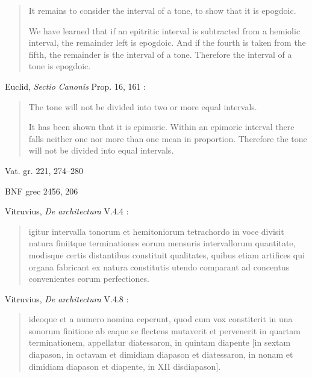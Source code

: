 \documentclass{amsart}
\theoremstyle{definition}
\begin{document}
\begin{quote}
It remains to consider the interval of a tone, to
show that it is epogdoic.

We have learned that if an epitritic interval is subtracted from a hemiolic
interval, the remainder left is epogdoic. And if the fourth is taken from the
fifth, the remainder is the interval of a tone. Therefore the interval of a tone
is epogdoic.
\end{quote}

Euclid, {\em Sectio Canonis} Prop. 16, 161 \cite[p.~202]{barker}:

\begin{quote}
The tone will not be divided into two or more
equal intervals.

It has been shown that it is epimoric. Within an epimoric interval there falls
neither one nor more than one mean in proportion. Therefore the tone will
not be divided into equal intervals.
\end{quote}

Vat. gr. 221, 274--280

BNF grec 2456, 206




























Vitruvius, {\em De architectura} V.4.4 \cite{vitruvius}:

\begin{quote}
igitur intervalla tonorum et hemitoniorum tetrachordo in voce divisit natura finiitque terminationes eorum mensuris intervallorum quantitate, modisque certis distantibus constituit qualitates, quibus etiam artifices qui organa fabricant ex natura constitutis utendo comparant ad concentus convenientes eorum perfectiones.
\end{quote}

Vitruvius, {\em De architectura} V.4.8 \cite{vitruvius}:

\begin{quote}
ideoque et a numero nomina ceperunt, quod cum vox constiterit in una sonorum finitione ab eaque se flectens mutaverit et pervenerit in quartam terminationem, appellatur diatessaron, in quintam diapente [in sextam diapason, in octavam et dimidiam diapason et diatessaron, in nonam et dimidiam diapason et diapente, in XII disdiapason].
\end{quote}
\end{document}
